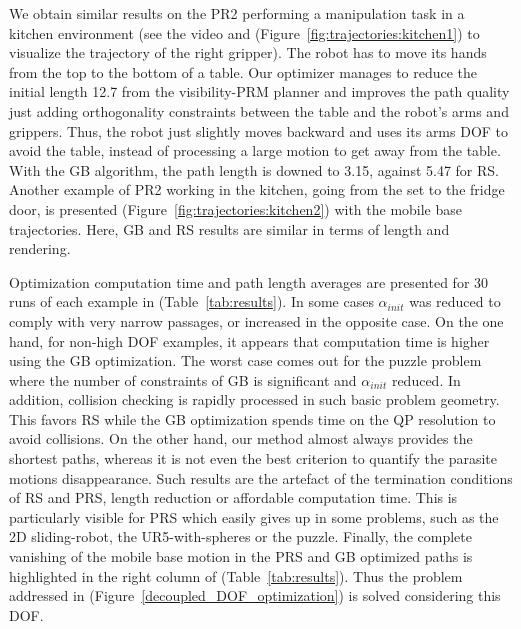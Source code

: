\documentclass{tADR2e}
\begin{document}
We obtain similar results on the PR2 performing a manipulation task 
in a kitchen environment (see the video and (Figure~\ref{fig:trajectories:kitchen1}) 
to visualize the trajectory of the right gripper). The robot has to move 
its hands from the top to the bottom of a table.
Our optimizer manages to reduce the initial length 12.7 from the visibility-PRM 
planner and improves the path quality 
just adding orthogonality constraints between the table and the 
robot's arms and grippers. Thus, the robot just slightly moves 
backward and uses its arms DOF to avoid the table, instead of 
processing a large motion to get away from the table. With the GB algorithm, the path length is 
downed to 3.15, against 5.47 for RS.
Another example of PR2 working in the kitchen, going from the set to the fridge 
door, is presented (Figure~\ref{fig:trajectories:kitchen2}) with the mobile base
trajectories. Here, GB and RS results are similar in terms of length and rendering.

\vspace{0.4cm}

Optimization computation time and path length averages are presented for 30 runs of 
each example in (Table~\ref{tab:results}). In some cases $\alpha_{init}$ was 
reduced to comply with very narrow passages, or increased in the opposite case. 
On the one hand, for non-high DOF examples, it appears that computation time is higher using the GB 
optimization. The worst case comes out for the puzzle problem where the number of 
constraints of GB is significant and $\alpha_{init}$ reduced. 
In addition, collision checking is rapidly processed in such basic problem geometry. This favors RS while the GB optimization spends time on the QP resolution to avoid collisions.
On the other hand, our method almost always provides the shortest paths, whereas it 
is not even the best criterion to quantify the parasite motions disappearance.
Such results are the artefact of the termination conditions of RS and PRS, length 
reduction or affordable computation time. This is particularly visible for PRS which 
easily gives up in some problems, such as the 2D sliding-robot, the 
UR5-with-spheres or the puzzle.
Finally, the complete vanishing of the mobile base motion in the PRS and GB 
optimized paths is highlighted in the right column of (Table~\ref{tab:results}). 
Thus the problem addressed in (Figure~\ref{decoupled_DOF_optimization}) is 
solved considering this DOF.
\end{document}
